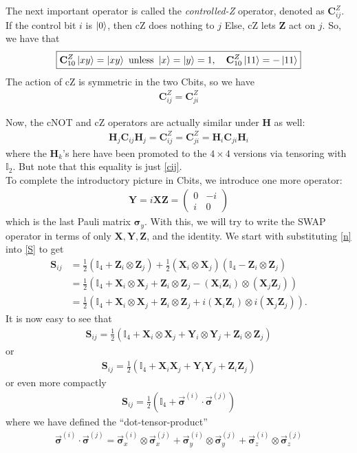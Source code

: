 \documentclass{book}
\theoremstyle{definition}
\newcommand{\nn}{\nonumber}
\newcommand{\X}{\mathbf{X}}
\newcommand{\s}{\mathbf{S}}
\newcommand{\f}[2]{\frac{#1}{#2}}
\newcommand{\lp}{\left(}
\newcommand{\rp}{\right)}
\newcommand{\Id}{\mathbb{I}}
\newcommand{\Z}{\mathbf{Z}}
\newcommand{\had}{\mathbf{H}}
\newcommand{\Y}{\mathbf{Y}}
\begin{document}
The next important operator is called the \textit{controlled-Z} operator, denoted as $\mathbf{C}_{ij}^Z$. If the control bit $i$ is $\ket{0}$, then cZ does nothing to $j$ Else, cZ lets $\Z$ act on $j$. So, we have that
\begin{align}
\boxed{\mathbf{C}_{10}^Z\ket{xy} = \ket{xy} \text{ unless } \ket{x} = \ket{y} = 1, \quad \mathbf{C}_{10}^Z\ket{11} = -\ket{11}   }
\end{align} 
The action of cZ is symmetric in the two Cbits, so we have
\begin{align}
\boxed{\mathbf{C}_{ij}^Z = \mathbf{C}_{ji}^Z}
\end{align}

Now, the cNOT and cZ operators are actually similar under $\had$ as well:
\begin{align}
\boxed{\had_j \mathbf{C}_{ij} \had_j = \mathbf{C}_{ij}^Z = \mathbf{C}_{ji}^Z = \had_i \mathbf{C}_{ji} \had_i}
\end{align}
where the $\had_k$'s here have been promoted to the $4\times 4$ versions via tensoring with $\mathbb{I}_2$. But note that this equality is just \eqref{cij}. \\

To complete the introductory picture in Cbits, we introduce one more operator:
\begin{align}
\boxed{\Y = i\X \Z = \begin{pmatrix}
0 & -i \\ i & 0
\end{pmatrix}}
\end{align}
which is the last Pauli matrix $\bm{\sigma}_y$. With this, we will try to write the SWAP operator in terms of only $\X, \Y, \Z$, and the identity. We start with substituting \eqref{n} into \eqref{S} to get
\begin{align}
\s_{ij} &= \f{1}{2}(\Id_4 + \Z_i \otimes \Z_j) + \f{1}{2}(\X_i \otimes \X_j)(\Id_4 - \Z_i \otimes \Z_j)\nn\\
&= \f{1}{2}\lp \Id_4 + \X_i\otimes \X_j + \Z_i \otimes \Z_j - (\X_i  \Z_i)\otimes (\X_j  \Z_j) \rp\nn\\
&= \f{1}{2}\lp \Id_4 + \X_i\otimes \X_j + \Z_i \otimes \Z_j + i(\X_i  \Z_i)\otimes i(\X_j  \Z_j) \rp.
\end{align} 
It is now easy to see that 
\begin{align}
{\s_{ij} = \f{1}{2}\lp \Id_4 + \X_i \otimes \X_j + \Y_i \otimes \Y_j + \Z_i \otimes \Z_j \rp}
\end{align}
or 
\begin{align}
{\s_{ij} = \f{1}{2}\lp \Id_4 + \X_i  \X_j + \Y_i  \Y_j + \Z_i  \Z_j \rp}
\end{align}
or even more compactly
\begin{align}
\boxed{\s_{ij} = \f{1}{2}\lp \Id_4 + \vec{\bm\sigma}^{(i)} \cdot \vec{\bm\sigma}^{(j)} \rp}
\end{align}
where we have defined the ``dot-tensor-product'' 
\begin{align}
\boxed{\vec{\bm\sigma}^{(i)} \cdot \vec{\bm\sigma}^{(j)} = \vec{\bm\sigma}^{(i)}_x \otimes \vec{\bm\sigma}^{(j)}_x
+
\vec{\bm\sigma}^{(i)}_y \otimes \vec{\bm\sigma}^{(j)}_y
+
\vec{\bm\sigma}^{(i)}_z \otimes \vec{\bm\sigma}^{(j)}_z}
\end{align}
\end{document}
